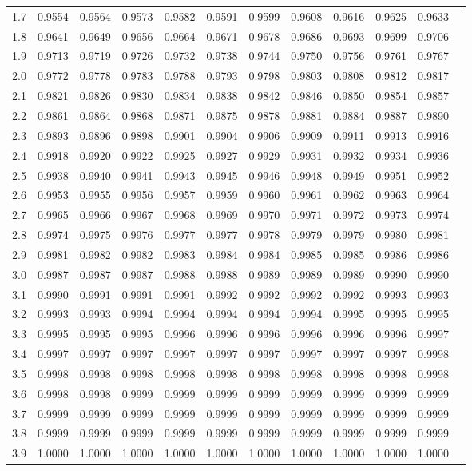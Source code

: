 \documentclass{article}
\begin{document}
\begin{center}
\begin{tabular}{rr@{\ }r@{\ }r@{\ }r@{\ }r@{\ }r@{\ }r@{\ }r@{\ }r@{\ }r@{\ }r}
1.7 &0.9554 &0.9564 &0.9573 &0.9582 &0.9591 &0.9599 &0.9608 &0.9616 &0.9625 &0.9633\\
1.8 &0.9641 &0.9649 &0.9656 &0.9664 &0.9671 &0.9678 &0.9686 &0.9693 &0.9699 &0.9706\\
1.9 &0.9713 &0.9719 &0.9726 &0.9732 &0.9738 &0.9744 &0.9750 &0.9756 &0.9761 &0.9767\\
2.0 &0.9772 &0.9778 &0.9783 &0.9788 &0.9793 &0.9798 &0.9803 &0.9808 &0.9812 &0.9817\\
2.1 &0.9821 &0.9826 &0.9830 &0.9834 &0.9838 &0.9842 &0.9846 &0.9850 &0.9854 &0.9857\\
2.2 &0.9861 &0.9864 &0.9868 &0.9871 &0.9875 &0.9878 &0.9881 &0.9884 &0.9887 &0.9890\\
2.3 &0.9893 &0.9896 &0.9898 &0.9901 &0.9904 &0.9906 &0.9909 &0.9911 &0.9913 &0.9916\\
2.4 &0.9918 &0.9920 &0.9922 &0.9925 &0.9927 &0.9929 &0.9931 &0.9932 &0.9934 &0.9936\\
2.5 &0.9938 &0.9940 &0.9941 &0.9943 &0.9945 &0.9946 &0.9948 &0.9949 &0.9951 &0.9952\\
2.6 &0.9953 &0.9955 &0.9956 &0.9957 &0.9959 &0.9960 &0.9961 &0.9962 &0.9963 &0.9964\\
2.7 &0.9965 &0.9966 &0.9967 &0.9968 &0.9969 &0.9970 &0.9971 &0.9972 &0.9973 &0.9974\\
2.8 &0.9974 &0.9975 &0.9976 &0.9977 &0.9977 &0.9978 &0.9979 &0.9979 &0.9980 &0.9981\\
2.9 &0.9981 &0.9982 &0.9982 &0.9983 &0.9984 &0.9984 &0.9985 &0.9985 &0.9986 &0.9986\\
3.0 &0.9987 &0.9987 &0.9987 &0.9988 &0.9988 &0.9989 &0.9989 &0.9989 &0.9990 &0.9990\\
3.1 &0.9990 &0.9991 &0.9991 &0.9991 &0.9992 &0.9992 &0.9992 &0.9992 &0.9993 &0.9993\\
3.2 &0.9993 &0.9993 &0.9994 &0.9994 &0.9994 &0.9994 &0.9994 &0.9995 &0.9995 &0.9995\\
3.3 &0.9995 &0.9995 &0.9995 &0.9996 &0.9996 &0.9996 &0.9996 &0.9996 &0.9996 &0.9997\\
3.4 &0.9997 &0.9997 &0.9997 &0.9997 &0.9997 &0.9997 &0.9997 &0.9997 &0.9997 &0.9998\\
3.5 &0.9998 &0.9998 &0.9998 &0.9998 &0.9998 &0.9998 &0.9998 &0.9998 &0.9998 &0.9998\\
3.6 &0.9998 &0.9998 &0.9999 &0.9999 &0.9999 &0.9999 &0.9999 &0.9999 &0.9999 &0.9999\\
3.7 &0.9999 &0.9999 &0.9999 &0.9999 &0.9999 &0.9999 &0.9999 &0.9999 &0.9999 &0.9999\\
3.8 &0.9999 &0.9999 &0.9999 &0.9999 &0.9999 &0.9999 &0.9999 &0.9999 &0.9999 &0.9999\\
3.9 &1.0000 &1.0000 &1.0000 &1.0000 &1.0000 &1.0000 &1.0000 &1.0000 &1.0000 &1.0000\\
\end{tabular}
\end{center}
\end{document}
